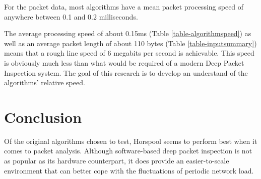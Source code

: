 \documentclass[11pt]{article}
\begin{document}
For the packet data, most algorithms have a mean packet processing speed of anywhere between 0.1 and 0.2 milliseconds.

The average processing speed of about 0.15ms (Table \ref{table-algorithmspeed}) as well as an average packet length of about 110 bytes (Table \ref{table-inputsummary}) means that a rough line speed of 6 megabits per second is achievable. This speed is obviously much less than what would be required of a modern Deep Packet Inspection system. The goal of this research is to develop an understand of the algorithms' relative speed.

\section{Conclusion}

Of the original algorithms chosen to test, Horspool \citep{horspool1980} seems to perform best when it comes to packet analysis.
Although software-based deep packet inspection is not as popular as its hardware counterpart, it does provide an easier-to-scale environment that can better cope with the fluctuations of periodic network load.



\end{document}
